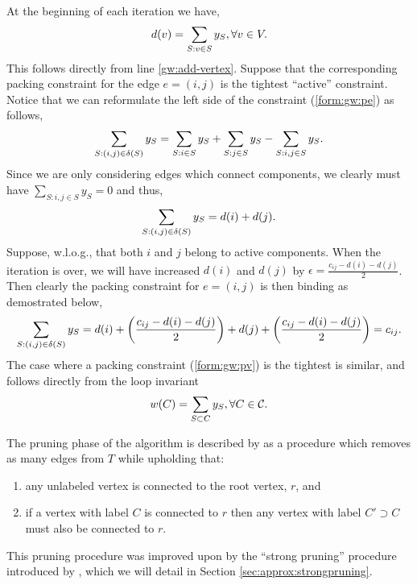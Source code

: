  At the beginning of each iteration we have,
 $$d(v) = \sum_{S: v \in S} y_S, \forall v \in V \mathnormal{.}$$
 This follows directly from line \ref{gw:add-vertex}. Suppose that the corresponding
 packing constraint for the edge $e = (i,j)$ is
  the tightest ``active'' constraint. Notice that we can reformulate the left side of the constraint (\ref{form:gw:pe}) as follows,
 $$\sum_{S: (i,j) \in \delta(S)} y_S = \sum_{S : i \in S} y_S + \sum_{S : j \in S} y_S - \sum_{S : i,j \in S} y_S\mathnormal{.}$$
 Since we are only considering edges which connect components, we clearly must have $\sum_{S : i,j \in S} y_S = 0$
 and thus,
 $$\sum_{S: (i,j) \in \delta(S)} y_S = d(i) + d(j)\mathnormal{.}$$
 Suppose, w.l.o.g., that both $i$ and $j$ belong to active components.
 When the iteration is over, we will have increased $d(i)$ and $d(j)$ by $\epsilon = \frac{c_{ij} - d(i) - d(j)}{2}$.
 Then clearly the packing constraint for $e = (i,j)$ is then binding as demostrated below,
 $$\sum_{S: (i,j) \in \delta(S)} y_S = d(i) + \left( \frac{c_{ij} - d(i) - d(j)}{2} \right) + d(j) +
 \left( \frac{c_{ij} - d(i) - d(j)}{2} \right)   = c_{ij}\mathnormal{.}$$
 The case where a packing constraint (\ref{form:gw:pv}) is the tightest is similar, and follows directly from the loop
 invariant
 $$w(C) = \sum_{S \subset C} y_S, \forall C \in \mathcal{C}\mathnormal{.}$$

 The pruning phase of the algorithm is described by \citet{goemans1995general}
 as a procedure which removes as many
 edges from $T$ while upholding that:
 \begin{enumerate}
 \item any unlabeled vertex is connected to the root vertex, $r$, and
 \item if a vertex with label $C$ is connected to $r$ then any vertex with
   label $C' \supset C$ must also be connected to $r$.
 \end{enumerate}
 This pruning procedure was improved upon by the ``strong pruning'' procedure introduced by \citet{Johnson:2000:PCS:338219.338637},
  which we will detail in Section \ref{sec:approx:strongpruning}.

